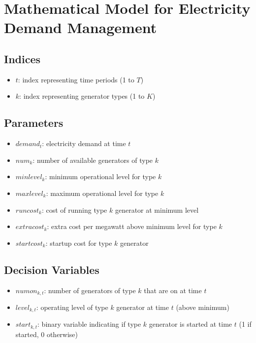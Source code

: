 \documentclass{article}
\begin{document}
\section*{Mathematical Model for Electricity Demand Management}

\subsection*{Indices}
\begin{itemize}
    \item \( t \): index representing time periods (1 to \( T \))
    \item \( k \): index representing generator types (1 to \( K \))
\end{itemize}

\subsection*{Parameters}
\begin{itemize}
    \item \( demand_t \): electricity demand at time \( t \)
    \item \( num_k \): number of available generators of type \( k \)
    \item \( minlevel_k \): minimum operational level for type \( k \)
    \item \( maxlevel_k \): maximum operational level for type \( k \)
    \item \( runcost_k \): cost of running type \( k \) generator at minimum level
    \item \( extracost_k \): extra cost per megawatt above minimum level for type \( k \)
    \item \( startcost_k \): startup cost for type \( k \) generator
\end{itemize}

\subsection*{Decision Variables}
\begin{itemize}
    \item \( numon_{k,t} \): number of generators of type \( k \) that are on at time \( t \)
    \item \( level_{k,t} \): operating level of type \( k \) generator at time \( t \) (above minimum)
    \item \( start_{k,t} \): binary variable indicating if type \( k \) generator is started at time \( t \) (1 if started, 0 otherwise)
\end{itemize}
\end{document}
